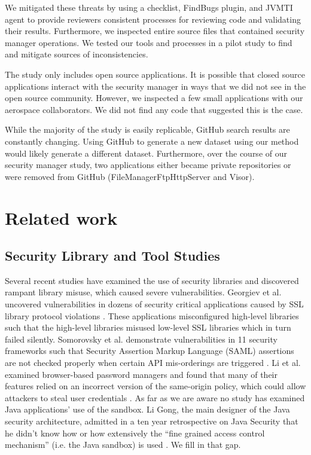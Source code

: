 \documentclass{sig-alternate}
\begin{document}
We mitigated these threats by using a checklist, FindBugs plugin, and JVMTI agent to
provide reviewers consistent processes for reviewing code
and validating their results. Furthermore,
we inspected entire source files that contained
security manager operations. We tested our tools and processes in a pilot study
to find and mitigate sources of inconsistencies.

The study only includes open source applications. It is possible
that closed source applications interact with the security manager
in ways that we did not see in the open source community. However,
we inspected a few small applications with our aerospace collaborators.
We did not find any code that suggested this is the case. 

While the majority of the study is easily replicable, GitHub search results are constantly
changing. Using GitHub to generate a new dataset using our method
would likely generate a different dataset. Furthermore, over the course of our security
manager study, two applications either became private repositories
or were removed from GitHub (FileManagerFtpHttpServer and Visor).

\section{Related work}
\label{sec:related}

\subsection{Security Library and Tool Studies}

Several recent studies have examined the use of security libraries
and discovered rampant library misuse, which caused severe vulnerabilities.
Georgiev et al. uncovered vulnerabilities in dozens of security critical
applications caused by SSL library protocol violations \cite{georgiev12most-dangerous}.
These applications misconfigured high-level libraries such that the
high-level libraries misused low-level SSL libraries which in turn
failed silently. Somorovsky et al. demonstrate vulnerabilities in
11 security frameworks such that Security Assertion Markup Language
(SAML) assertions are not checked properly when certain API mis-orderings
are triggered \cite{somorovsky12breaking}. Li et al. examined browser-based
password managers and found that many of their features relied on
an incorrect version of the same-origin policy, which could allow
attackers to steal user credentials \cite{li2014emperor}. As far
as we are aware no study has examined Java applications' use of the
sandbox. Li Gong, the main designer of the Java security architecture,
admitted in a ten year retrospective on Java Security that he didn't
know how or how extensively the ``fine grained access control mechanism''
(i.e. the Java sandbox) is used \cite{gong2009java}. We fill in that
gap. 
\end{document}
